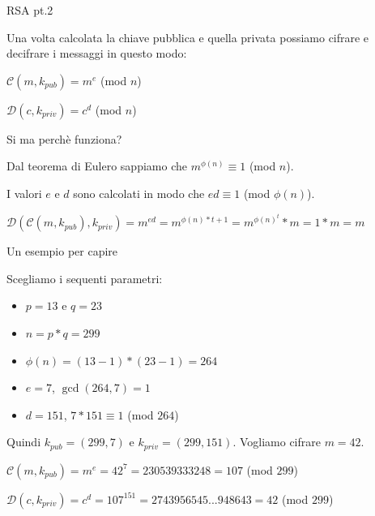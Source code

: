 \documentclass[handout, xcolor=dvipsnames,aspectratio=169]{beamer}
\begin{document}
\begin{frame}{RSA pt.2}

Una volta calcolata la chiave pubblica e quella privata possiamo cifrare e decifrare i messaggi in questo modo:

\pause
\medskip

$\mathcal{C}(m, k_{pub}) = m^{e} $ (mod $n$) \pause
  
$\mathcal{D}(c, k_{priv}) = c^{d} $ (mod $n$)

\medskip

\pause

Si ma perchè funziona?

\medskip

\pause

Dal teorema di Eulero sappiamo che $m^{\phi(n)} \equiv 1 $ (mod $n$).

I valori $e$ e $d$ sono calcolati in modo che $ed \equiv 1$ (mod $\phi(n)$).

\medskip

$\mathcal{D}(\mathcal{C}(m, k_{pub}), k_{priv}) = m^{ed} = m^{\phi(n)*t + 1} = m^{\phi(n)^{t}} * m = 1 * m = m$

\end{frame}

\begin{frame}{Un esempio per capire}
  
\pause

  Scegliamo i sequenti parametri:
  
  \begin{itemize}
    \item $p = 13$ e $q = 23$
    \item $n = p*q = 299$
    \item $\phi(n) = (13-1)*(23-1) = 264$
    \item $e = 7$, $\gcd(264, 7) = 1$
    \item $d = 151$, $7*151 \equiv 1 $ (mod $264$)
  \end{itemize}
  
  \smallskip
  
\pause

  Quindi $k_{pub} = (299, 7)$ e $k_{priv} = (299, 151)$. Vogliamo cifrare $m = 42$.
  
\pause

  \medskip
  
  $\mathcal{C}(m, k_{pub}) = m^{e} = 42^7 = 230539333248 = 107$ (mod $299$) 
 
 \pause
  
  $\mathcal{D}(c, k_{priv}) = c^{d} = 107^{151} = 2743956545...948643 = 42 $ (mod $299$)

\end{frame}
\end{document}
